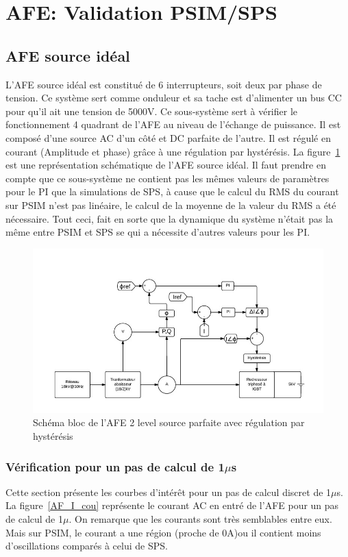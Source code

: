 \documentclass[11pt,letterpaper,final]{report}
\begin{document}
\clearpage
\section{AFE: Validation PSIM/SPS}
\subsection{AFE source idéal}
L'AFE source idéal est constitué de 6 interrupteurs, soit deux par phase de tension. Ce système sert comme onduleur et sa tache est d'alimenter un bus CC pour qu'il ait une tension de 5000V. Ce sous-système sert à vérifier le fonctionnement 4 quadrant de l'AFE au niveau de l'échange de puissance. Il est composé d'une source AC d'un côté et DC parfaite de l'autre. Il est régulé en courant (Amplitude et phase) grâce à une régulation par hystérésis. La figure~\ref{AFE} est une représentation schématique de l'AFE source idéal. Il faut prendre en compte que ce sous-système ne contient pas les mêmes valeurs de paramètres pour le PI que la simulations de SPS, à cause que le calcul du RMS du courant sur PSIM n'est pas linéaire, le calcul de la moyenne de la valeur du RMS a été nécessaire. Tout ceci, fait en sorte que la dynamique du système n'était pas la même entre PSIM et SPS se qui a nécessite d'autres valeurs pour les PI.

\begin{figure}[htb]
\centering
\includegraphics[scale=0.5]{Fig/AFEIDEAL/AFE.jpg}
\caption{Schéma bloc de l'AFE 2 level source parfaite avec régulation par hystérésis}
\label{AFE}
\end{figure}

\subsubsection{Vérification pour un pas de calcul de 1$\mu$s}
Cette section présente les courbes d'intérêt pour un pas de calcul discret de 1$\mu$s. La figure~\ref{AF_I_cou} représente le courant AC en entré de l'AFE pour un pas de calcul de 1$\mu$. On remarque que les courants sont très semblables entre eux. Mais sur PSIM, le courant a une région (proche de 0A)ou il contient moins d'oscillations comparés à celui de SPS.
\end{document}
